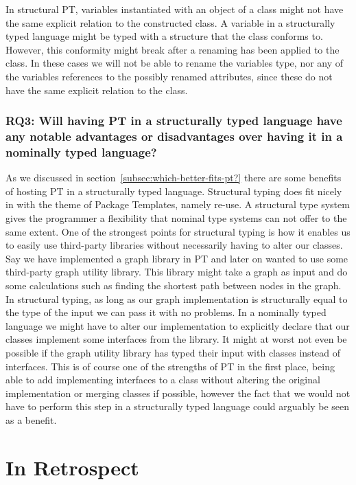In structural PT, variables instantiated with an object of a class might not have the same explicit relation to the constructed class.
A variable in a structurally typed language might be typed with a structure that the class conforms to.
However, this conformity might break after a renaming has been applied to the class.
In these cases we will not be able to rename the variables type, nor any of the variables references to the possibly renamed attributes, since these do not have the same explicit relation to the class.

\subsubsection{RQ3: Will having PT in a structurally typed language have any notable advantages or disadvantages over having it in a nominally typed language?}

As we discussed in section~\vref{subsec:which-better-fits-pt?} there are some benefits of hosting PT in a structurally typed language.
Structural typing does fit nicely in with the theme of Package Templates, namely re-use.
A structural type system gives the programmer a flexibility that nominal type systems can not offer to the same extent.
One of the strongest points for structural typing is how it enables us to easily use third-party libraries without necessarily having to alter our classes.
Say we have implemented a graph library in PT and later on wanted to use some third-party graph utility library.
This library might take a graph as input and do some calculations such as finding the shortest path between nodes in the graph.
In structural typing, as long as our graph implementation is structurally equal to the type of the input we can pass it with no problems.
In a nominally typed language we might have to alter our implementation to explicitly declare that our classes implement some interfaces from the library.
It might at worst not even be possible if the graph utility library has typed their input with classes instead of interfaces.
This is of course one of the strengths of PT in the first place, being able to add implementing interfaces to a class without altering the original implementation or merging classes if possible, however the fact that we would not have to perform this step in a structurally typed language could arguably be seen as a benefit.


\section{In Retrospect}\label{sec:in-retrospect}

